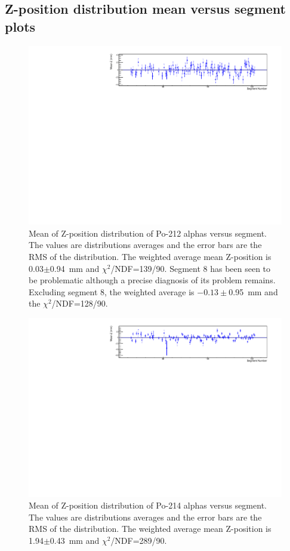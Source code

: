 \subsection{Z-position distribution mean versus segment plots}
\begin{figure}[!h]
	\centering
	\includegraphics[width=1.05\textwidth]{figures/PubBiPo212meanZvsCell.pdf}
	\caption{\label{fig:meanZvsCell212}Mean of Z-position distribution of Po-212 alphas versus segment. The values are distributions averages and the error bars are the RMS of the distribution. The weighted average mean Z-position is 0.03$\pm$0.94~mm and $\chi^2$/NDF=139/90. Segment 8 has been seen to be problematic although a precise diagnosis of its problem remains. Excluding segment 8, the weighted average is $-0.13\pm$0.95~mm and the $\chi^2$/NDF=128/90.  }
\end{figure}
\begin{figure}[!h]
	\centering
	\includegraphics[width=1.05\textwidth]{figures/PubBiPo214meanZvsCell.pdf}
	\caption{\label{fig:meanZvsCell214}Mean of Z-position distribution of Po-214 alphas versus segment. The values are distributions averages and the error bars are the RMS of the distribution. The weighted average mean Z-position is 1.94$\pm$0.43~mm and $\chi^2$/NDF=289/90.}
\end{figure}
\clearpage
\newpage
